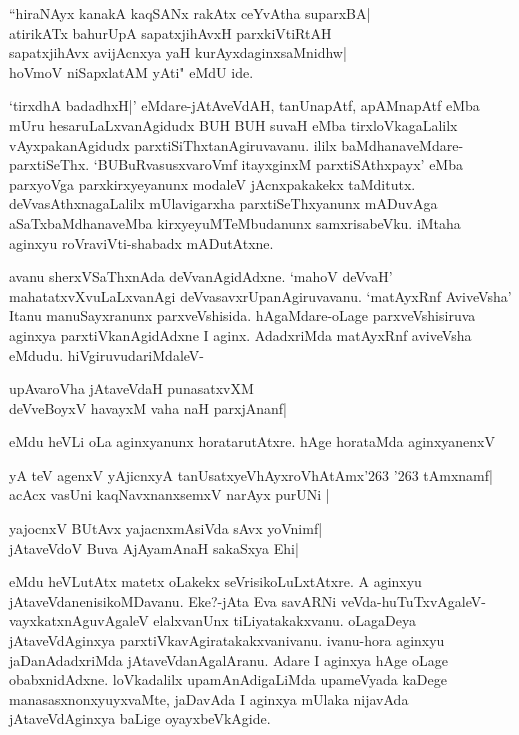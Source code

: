 \begin{shloka}
``hiraNAyx kanakA kaqSANx rakAtx ceYvAtha suparxBA|\\\label{116}
atirikATx bahurUpA sapatxjihAvxH parxkiVtiRtAH\\
sapatxjihAvx avijAcnxya yaH kurAyxdaginxsaMnidhw|\\
hoVmoV niSapxlatAM yAti" eMdU ide.
\end{shloka}

`tirxdhA badadhxH|' eMdare-jAtAveVdAH, tanUnapAtf, apAMnapAtf eMba mUru 
hesaruLaLxva\-nA\-gidudx BUH BUH suvaH eMba tirxloVkagaLalilx vAyxpakanAgidudx parxtiSiThxtanAgiruvavanu. ililx baMdhana\-veMdare\--parxtiSeThx. `BUBuRvasusxvaroVmf\label{116} itayxginxM parxtiSAthxpayx' eMba parxyoVga parxkirxyeyanunx modaleV jAcnxpakakekx taMditutx. deVvasAthxnagaLalilx mUlavigarxha parxtiSeThxyanunx mADuvAga aSaTxbaMdhanaveMba kirxyeyuMTeMbu\-danunx samxrisabeVku. iMtaha aginxyu roVraviVti-shabadx mADutAtxne.

avanu sherxVSaThxnAda deVvanAgidAdxne. `mahoV deVvaH' 
mahatatxvXvuLaLxvanAgi deVvasavxrUpanAgiru\-vavanu. `matAyxRnf AviveVsha' Itanu manuSayxranunx parxveVshisida. hAgaMdare-oLage parxveVshisiruva aginxya parxtiVka\-nAgi\-dAdxne  I aginx. AdadxriMda matAyxRnf aviveVsha eMdudu. hiVgiruvudariMdaleV-

\begin{shloka}
upAvaroVha jAtaveVdaH punasatxvXM\\\label{116}
deVveBoyxV havayxM vaha naH parxjAnanf|
\end{shloka}

\noindent
eMdu heVLi oLa aginxyanunx horatarutAtxre. hAge horataMda aginxyanenxV 

\begin{shloka}
yA teV agenxV yAjicnxyA tanUsatxyeVhAyxroVhAtAmx\char'263 \char'263 tAmxnamf|\\\label{116}
acAcx vasUni kaqNavxnanxsemxV narAyx purUNi |
\end{shloka}

\begin{shloka}
yajocnxV BUtAvx yajacnxmAsiVda sAvx yoVnimf|\\
jAtaveVdoV Buva AjAyamAnaH sakaSxya Ehi|
\end{shloka}

\noindent
eMdu heVLutAtx matetx oLakekx seVrisikoLuLxtAtxre. A aginxyu 
jAtaveVdanenisi\-koMDa\-vanu. Eke?-jAta Eva \-savARNi 
veVda-huTuTxvAgaleV-vayxkatxnAguvAgaleV elalxvanUnx tiLiyatakakxvanu. oLagaDeya jAta\-veVdA\-ginxya parxtiVkavAgiratakakxvanivanu. ivanu-hora aginxyu jaDanAdadxriMda jAtaveVdanAga\-lAranu. Adare I aginxya hAge oLage obabxnidAdxne. loVkadalilx upamAnAdigaLiMda upameVyada kaDege manasasxnonxyuyx\-vaMte, jaDavAda I aginxya mUlaka nijavAda jAtaveVdAginxya baLige oyayxbeVkA\-gide.


